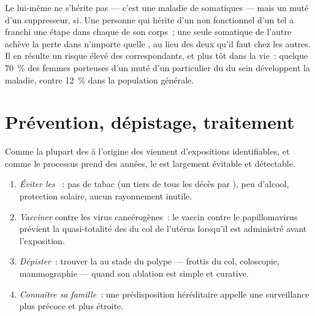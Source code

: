 \begin{proposition}\label{prop:g11:cancer:inherited}
Le  lui-même ne s'hérite pas --- c'est une maladie de 
somatiques --- mais un  muté d'un  suppresseur, si. Une
personne qui hérite d'un  non fonctionnel d'un tel  a franchi
une étape dans chaque  de son corps~; une seule 
somatique de l'autre  achève la perte dans n'importe quelle
, au lieu des deux qu'il faut chez les autres. Il en résulte un
risque élevé des  correspondants, et plus tôt dans la vie~:
quelque 70~\% des femmes porteuses d'un  muté d'un 
particulier du  du sein développent la maladie, contre 12~\% dans
la population générale.
\end{proposition}
\admitted

\section{Prévention, dépistage, traitement}

\begin{method}\label{met:g11:cancer:prevention}
Comme la plupart des  à l'origine des  viennent
d'expositions identifiables, et comme le processus prend des années, le
 est largement évitable et détectable.
\begin{enumerate}
  \item \emph{Éviter les }~: pas de tabac (un tiers de
        tous les décès par ), peu d'alcool, protection solaire,
        aucun rayonnement inutile.
  \item \emph{Vacciner} contre les virus cancérogènes~: le vaccin
        contre le papillomavirus prévient la quasi-totalité des 
        du col de l'utérus lorsqu'il est administré avant l'exposition.
  \item \emph{Dépister}~: trouver la  au stade du polype ---
        frottis du col, coloscopie, mammographie --- quand son ablation
        est simple et curative.
  \item \emph{Connaître sa famille}~: une prédisposition héréditaire
        appelle une surveillance plus précoce et plus étroite.
\end{enumerate}
\end{method}

